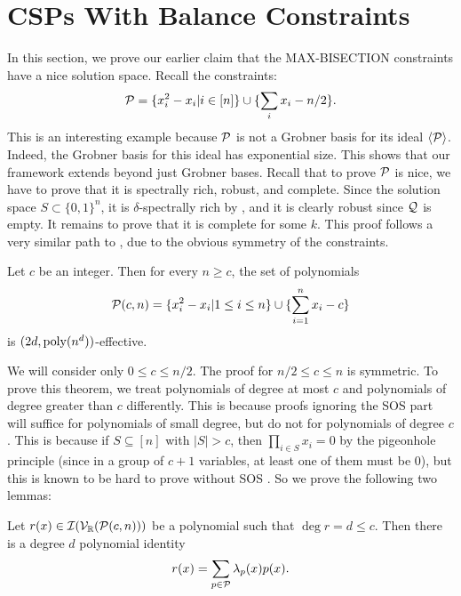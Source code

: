 \section{CSPs With Balance Constraints}\label{sec:balance}
In this section, we prove our earlier claim that the MAX-BISECTION constraints have a nice solution space. Recall the constraints:
\[\mathcal P = \{x_i^2 - x_i | i \in [n]\} \cup \{\sum_i x_i - n/2\}.\]
This is an interesting example because $\mathcal P$ is not a Grobner basis for its ideal $\langle \mathcal P \rangle$. Indeed, the Grobner basis for this ideal has exponential size. This shows that our framework extends beyond just Grobner bases. Recall that to prove $\mathcal P$ is nice, we have to prove that it is spectrally rich, robust, and complete. Since the solution space $S \subset \{0,1\}^n$, it is $\delta$-spectrally rich by , and it is clearly robust since $\mathcal Q$ is empty. It remains to prove that it is complete for some $k$. This proof follows a very similar path to \cite{}, due to the obvious symmetry of the constraints. 
\begin{theorem}
Let $c$ be an integer. Then for every $n \geq c$, the set of polynomials
\[\mathcal P(c,n) = \{x_i^2 - x_i | 1 \leq i \leq n\} \cup \{\sum_{i=1}^n x_i - c\}\]
is $(2d, \operatorname{poly}(n^d))$-effective.
\end{theorem}
We will consider only $0 \leq c \leq n/2$. The proof for $n/2 \leq c \leq n$ is symmetric. To prove this theorem, we treat polynomials of degree at most $c$ and polynomials of degree greater than $c$ differently. This is because proofs ignoring the SOS part will suffice for polynomials of small degree, but do not for polynomials of degree $c$. This is because if $S \subseteq [n]$ with $|S| > c$, then $\prod_{i \in S} x_i = 0$ by the pigeonhole principle (since in a group of $c+1$ variables, at least one of them must be $0$), but this is known to be hard to prove without SOS \cite{}. So we prove the following two lemmas:
\begin{lemma}\label{lem:lowdeg}
Let $r(x) \in \mathcal I(\mathcal V_\mathbb R(\mathcal P(c,n)))$ be a polynomial such that $\deg r = d \leq c$. Then there is a degree $d$ polynomial identity
\[r(x) =  \sum_{p \in \mathcal P} \lambda_p(x) p(x).\]
\end{lemma}
